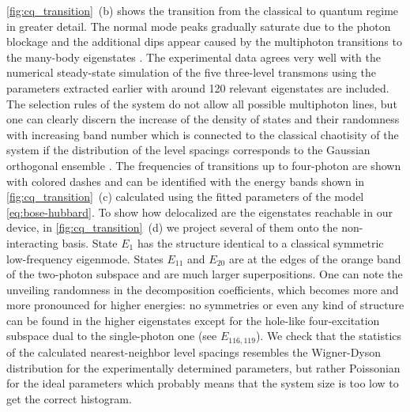\documentclass[%
 aps, prl,
 amsmath,amssymb,
 reprint,%
superscriptaddress
]{revtex4-2}
\begin{document}
\autoref{fig:cq_transition}~(b) shows the transition from the classical to quantum regime in greater detail. The normal mode peaks gradually saturate due to the photon blockage and the additional dips appear caused by the multiphoton transitions to the many-body eigenstates \cite{Biella2015,PhysRevA.102.013707,roberts2020driven}. The experimental data agrees very well with the numerical steady-state simulation of the five three-level transmons using the parameters extracted earlier with around 120 relevant eigenstates are included. The selection rules of the system do not allow all possible multiphoton lines, but one can clearly discern the increase of the density of states and their randomness with increasing band number which is connected to the classical chaotisity of the system if the distribution of the level spacings corresponds to the Gaussian orthogonal ensemble \cite{bohigas1984characterization,zimmermann1986manifestation, livan2018introduction}. The frequencies of transitions up to four-photon are shown with colored dashes and can be identified with the energy bands shown in \autoref{fig:cq_transition}~(c) calculated using the fitted parameters of the model \eqref{eq:bose-hubbard}. To show how delocalized are the eigenstates reachable in our device, in \autoref{fig:cq_transition}~(d) we project several of them onto the non-interacting basis. State $E_1$ has the structure identical to a classical symmetric low-frequency eigenmode. States $E_{11}$ and $E_{20}$ are at the edges of the orange band of the two-photon subspace and are much larger superpositions. One can note the unveiling randomness in the decomposition coefficients, which becomes more and more pronounced for higher energies: no symmetries or even any kind of structure can be found in the higher eigenstates except for the hole-like four-excitation subspace dual to the single-photon one (see $E_{116, 119}$). We check that the statistics of the calculated nearest-neighbor level spacings resembles the Wigner-Dyson distribution for the experimentally determined parameters, but rather Poissonian for the ideal parameters which probably means that the system size is too low to get the correct histogram.
\end{document}
